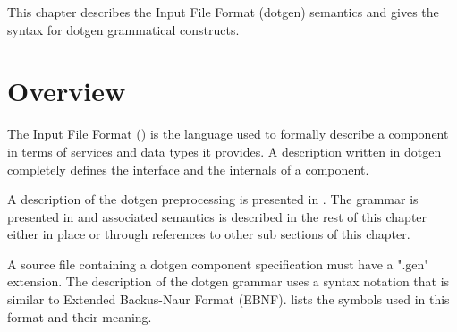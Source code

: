 %
%
%
%
%

This chapter describes the \GenoM{} Input File Format (dotgen) semantics and
gives the syntax for dotgen grammatical constructs.

\section{Overview}

The \GenoM{}  Input File Format ()  is the language  used to formally
describe a \GenoM{} component in terms  of services and data types it provides.
A  description written  in  dotgen  completely defines  the  interface and  the
internals of a component.

A    description    of   the    dotgen    preprocessing    is   presented    in
.     The    grammar    is
presented    in        and
associated semantics is  described in the rest of this  chapter either in place
or through references to other sub sections of this chapter.

A source  file containing a dotgen  component specification must  have a ".gen"
extension. The description of the dotgen grammar uses a syntax notation that is
similar        to       Extended        Backus-Naur        Format       (EBNF).
  lists  the  symbols used  in
this format and their meaning.

